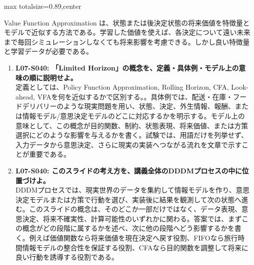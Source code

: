 \begin{minipage}[t]{0.58\textwidth}
\begin{adjustbox}{max totalsize={\textwidth}{0.89\textheight},center}
\begin{minipage}{\textwidth}
Value Function Approximation は、状態または後決定状態の将来価値を特徴量とモデルで近似する方法である。学習した価値を使えば、各決定について遠い未来まで毎回シミュレーションしなくても将来影響を考慮できる。しかし良い特徴量と学習データが必要である。\par{}\begin{enumerate}\item \textbf{L07-S040: 「Limited Horizon」の概念を、定義・具体例・モデル上の意味の順に説明せよ。}\\定義としては、Policy Function Approximation, Rolling Horizon, CFA, Look-ahead, VFAを何を近似するかで区別する。。具体例では、配送・在庫・フードデリバリーのような現実問題を用い、状態、決定、外生情報、報酬、または情報モデル/意思決定モデルのどこに対応するかを明示する。モデル上の意味として、この概念が目的関数、制約、状態表現、将来価値、または方策選択にどのような影響を与えるかを書く。試験では、用語だけを列挙せず、入力データから意思決定、さらに現実の実装へつながる流れを文章で示すことが重要である。\item \textbf{L07-S040: このスライドの考え方を、講義全体のDDDMプロセスの中に位置づけよ。}\\DDDMプロセスでは、現実世界のデータを集約して情報モデルを作り、意思決定モデルまたは方策で行動を選び、実装後に結果を観測して次の状態へ進む。このスライドの概念は、そのどこか一部だけではなく、データ表現、意思決定、将来不確実性、計算可能性のいずれかに関わる。答案では、まずこの概念がどの段階に属するかを述べ、次に他の段階へどう影響するかを書く。例えば価値関数なら将来価値を現在決定へ戻す役割、FIFOなら旅行時間情報モデルの整合性を保証する役割、CFAなら目的関数を調整して将来に良い行動を誘導する役割である。\end{enumerate}
\end{minipage}
\end{adjustbox}
\end{minipage}


